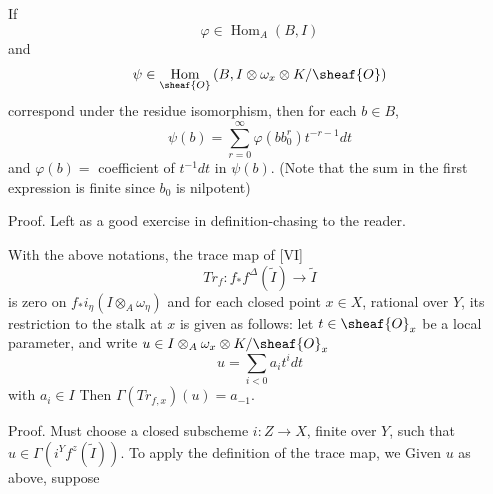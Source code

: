 \documentclass[12pt]{book}
\DeclareMathOperator{\Hom}{Hom}
\begin{document}
\begin{lemma}
If
\[
\varphi \in \Hom_{A}(B, I)
\]
and
\[
\psi \in \Hom_{\sheaf{O}}\left(B, I \otimes \omega_{x} \otimes K / \sheaf{O}\right)
\]
correspond under the residue isomorphism, then for each \(b \in B\),
\[
\psi(b)=\sum_{r=0}^{\infty} \varphi\left(b b_{0}^{r}\right) t^{-r-1} dt
\]
and \(\varphi(b) =\) coefficient of \(t^{-1} dt\) in \(\psi(b)\).
(Note that the sum in the first expression is finite since \(b_{0}\) is nilpotent)

\setcounter{page}{362}
\end{lemma}

Proof. Left as a good exercise in definition-chasing to the reader.

\begin{proposition}
With the above notations, the trace
map of [VI]
\[
Tr_{f}: f_{*} f^{\Delta}(\tilde{I}) \to \tilde{I}
\]
is zero on \(f_{*} i_{\eta}(I \otimes_{A} \omega_{\eta})\) and for each closed point \(x \in X\), rational over \(Y\), its restriction to the stalk at \(x\) is given as follows: let \(t \in \sheaf{O}_{x}\) be a local parameter, and write \(u \in I \otimes_{A} \omega_{x} \otimes K / \sheaf{O}_{x}\)
\[
u=\sum_{i<0} a_{i} t^{i} dt
\]
with \(a_{i} \in I\) Then \(\Gamma(Tr_{f,x})(u)=a_{-1}\).
\end{proposition}

Proof. Must choose a closed subscheme \(i: Z \to X\), finite over \(Y\), such that \(u \in \Gamma(i^{Y} f^{z}(\tilde{I}))\).
To apply the definition of the trace map, we
Given \(u\) as above, suppose
\end{document}
